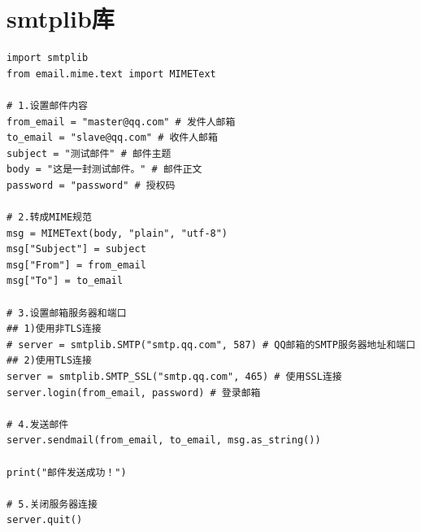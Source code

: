 \chapter{smtplib库} 


\begin{lstlisting}[style=demostyle,numbers=none]
import smtplib
from email.mime.text import MIMEText

# 1.设置邮件内容
from_email = "master@qq.com" # 发件人邮箱
to_email = "slave@qq.com" # 收件人邮箱
subject = "测试邮件" # 邮件主题
body = "这是一封测试邮件。" # 邮件正文
password = "password" # 授权码

# 2.转成MIME规范
msg = MIMEText(body, "plain", "utf-8")
msg["Subject"] = subject
msg["From"] = from_email
msg["To"] = to_email

# 3.设置邮箱服务器和端口
## 1)使用非TLS连接
# server = smtplib.SMTP("smtp.qq.com", 587) # QQ邮箱的SMTP服务器地址和端口
## 2)使用TLS连接
server = smtplib.SMTP_SSL("smtp.qq.com", 465) # 使用SSL连接
server.login(from_email, password) # 登录邮箱

# 4.发送邮件
server.sendmail(from_email, to_email, msg.as_string())

print("邮件发送成功！")

# 5.关闭服务器连接
server.quit()
\end{lstlisting}